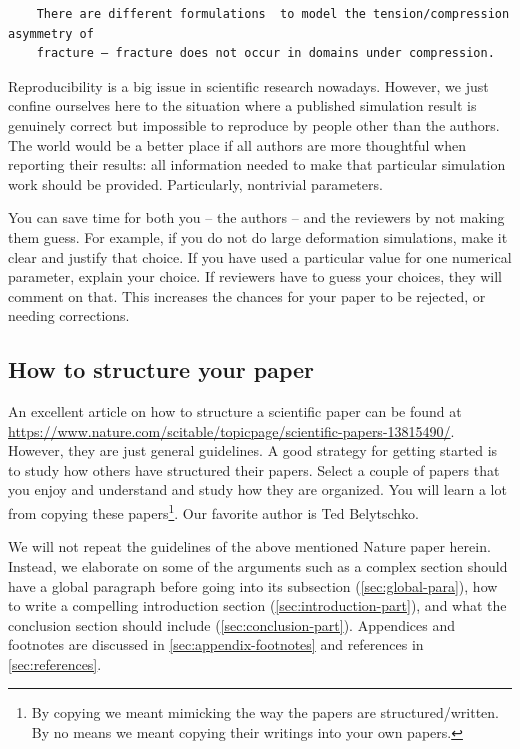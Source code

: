 \documentclass[authoryear,3p,times,preprint,review,fleqn]{elsarticle}
\numberwithin{equation}{section}
\theoremstyle{remark}
\begin{document}
 \begin{verbatim}
    There are different formulations  to model the tension/compression asymmetry of 
    fracture – fracture does not occur in domains under compression.
 \end{verbatim}


Reproducibility is a big issue in scientific research nowadays. However, we just confine ourselves here to the situation where a published simulation result is genuinely correct but impossible to reproduce by people other than the authors. The world would be a better place if all authors are more thoughtful when reporting their results: all information needed to make that particular simulation work should be provided. Particularly, nontrivial parameters.


You can save time for both you -- the authors -- and the reviewers by not making them guess. For example, if you do not do large deformation simulations, make it clear and justify that choice. If you have used a particular value for one numerical parameter, explain your choice. If reviewers have to guess your choices, they will comment on that. This increases the chances for your paper to be rejected, or needing corrections.




\subsection{How to structure your paper}\label{structure}


An excellent article on how to structure a scientific paper can be found at \url{https://www.nature.com/scitable/topicpage/scientific-papers-13815490/}. However, they are just general guidelines. A good strategy for getting started is to study how others have structured their papers. Select a couple of papers that you enjoy and understand and study how they are organized. You will learn a lot from copying these papers\footnote{By copying we meant mimicking the way the papers are structured/written. By no means we meant copying their writings into your own papers.}. Our favorite author is Ted Belytschko.

 We will not repeat the guidelines of the above mentioned Nature paper herein. Instead, we elaborate on some of the arguments such as a complex section should have a global paragraph before going into its subsection (\cref{sec:global-para}), how to write a compelling introduction section (\cref{sec:introduction-part}), and 
what the conclusion section  should include (\cref{sec:conclusion-part}).  Appendices and footnotes are discussed in \cref{sec:appendix-footnotes} and references in \cref{sec:references}.
\end{document}
